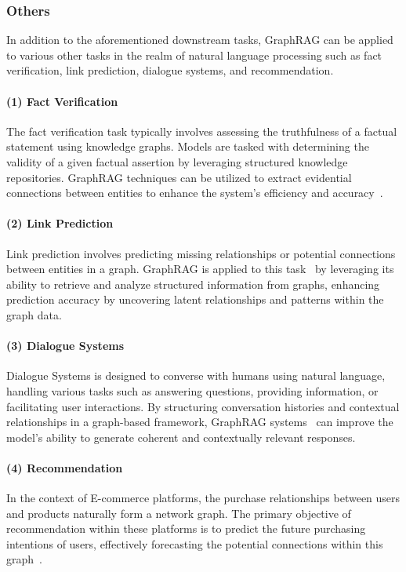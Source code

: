 \documentclass[acmsmall]{acmart}
\begin{document}
\subsubsection{Others}
In addition to the aforementioned downstream tasks, GraphRAG can be applied to various other tasks in the realm of natural language processing such as fact verification, link prediction, dialogue systems, and recommendation.

\paragraph{(1) Fact Verification}
The fact verification task typically involves assessing the truthfulness of a factual statement using knowledge graphs. Models are tasked with determining the validity of a given factual assertion by leveraging structured knowledge repositories. GraphRAG techniques can be utilized to extract evidential connections between entities to enhance the system's efficiency and accuracy~\cite{ref:noname6,ref:tog,ref:oda,ref:foodgpt}.

\paragraph{(2) Link Prediction} Link prediction involves predicting missing relationships or potential connections between entities in a graph. GraphRAG is applied to this task~\cite{ref:lark,ref:kg-r3} by leveraging its ability to retrieve and analyze structured information from graphs, enhancing prediction accuracy by uncovering latent relationships and patterns within the graph data.

\paragraph{(3) Dialogue Systems} Dialogue Systems is designed to converse with humans using natural language, handling various tasks such as answering questions, providing information, or facilitating user interactions. By structuring conversation histories and contextual relationships in a graph-based framework, GraphRAG systems~\cite{ref:difar} can improve the model's ability to generate coherent and contextually relevant responses.

\paragraph{(4) Recommendation} 
In the context of E-commerce platforms, the purchase relationships between users and products naturally form a network graph. The primary objective of recommendation within these platforms is to predict the future purchasing intentions of users, effectively forecasting the potential connections within this graph~\cite{ref:rete}.
\end{document}
